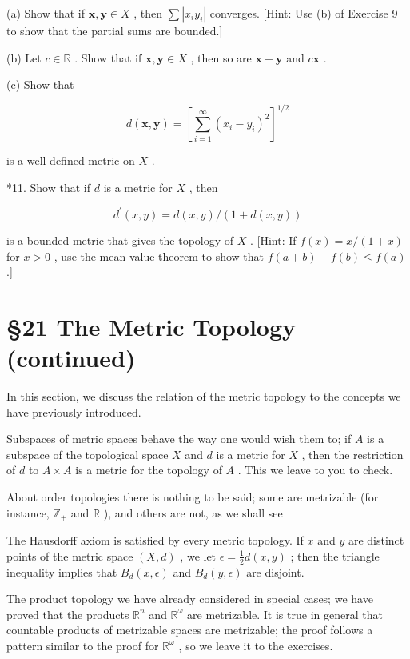 \documentclass[10pt]{article}
\begin{document}
(a) Show that if \(\mathbf{x},\mathbf{y} \in  X\) , then \(\sum \left| {{x}_{i}{y}_{i}}\right|\) converges. [Hint: Use (b) of Exercise 9 to show that the partial sums are bounded.]

(b) Let \(c \in  \mathbb{R}\) . Show that if \(\mathbf{x},\mathbf{y} \in  X\) , then so are \(\mathbf{x} + \mathbf{y}\) and \(c\mathbf{x}\) .

(c) Show that

\[
d\left( {\mathbf{x},\mathbf{y}}\right)  = {\left\lbrack  \mathop{\sum }\limits_{{i = 1}}^{\infty }{\left( {x}_{i} - {y}_{i}\right) }^{2}\right\rbrack  }^{1/2}
\]

is a well-defined metric on \(X\) .

*11. Show that if \(d\) is a metric for \(X\) , then

\[
{d}^{\prime }\left( {x,y}\right)  = d\left( {x,y}\right) /\left( {1 + d\left( {x,y}\right) }\right)
\]

is a bounded metric that gives the topology of \(X\) . [Hint: If \(f\left( x\right)  = x/\left( {1 + x}\right)\) for \(x > 0\) , use the mean-value theorem to show that \(f\left( {a + b}\right)  - f\left( b\right)  \leq  f\left( a\right)\) .]

\section*{§21 The Metric Topology (continued)}

In this section, we discuss the relation of the metric topology to the concepts we have previously introduced.

Subspaces of metric spaces behave the way one would wish them to; if \(A\) is a subspace of the topological space \(X\) and \(d\) is a metric for \(X\) , then the restriction of \(d\) to \(A \times  A\) is a metric for the topology of \(A\) . This we leave to you to check.

About order topologies there is nothing to be said; some are metrizable (for instance, \({\mathbb{Z}}_{ + }\) and \(\mathbb{R}\) ), and others are not, as we shall see

The Hausdorff axiom is satisfied by every metric topology. If \(x\) and \(y\) are distinct points of the metric space \(\left( {X,d}\right)\) , we let \(\epsilon  = \frac{1}{2}d\left( {x,y}\right)\) ; then the triangle inequality implies that \({B}_{d}\left( {x,\epsilon }\right)\) and \({B}_{d}\left( {y,\epsilon }\right)\) are disjoint.

The product topology we have already considered in special cases; we have proved that the products \({\mathbb{R}}^{n}\) and \({\mathbb{R}}^{\omega }\) are metrizable. It is true in general that countable products of metrizable spaces are metrizable; the proof follows a pattern similar to the proof for \({\mathbb{R}}^{\omega }\) , so we leave it to the exercises.
\end{document}
